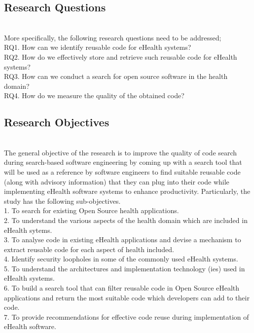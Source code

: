 \documentclass[a4paper]{article}
\begin{document}
\subsection{Research Questions}\\ More specifically, the following research questions need to be addressed;\\
RQ1. How can we identify reusable code for eHealth systems?\\
RQ2. How do we effectively store and retrieve such reusable code for eHealth systems?\\
RQ3. How can we conduct a search for open source software in the health domain?\\
RQ4. How do we measure the quality of the obtained code?\\ 

\subsection{Research Objectives}\\
The general objective of the research is to improve the quality of code search during search-based software engineering by coming up with a search tool that will be used as a reference by software engineers to find suitable reusable code (along with advisory information) that they can plug into their code while implementing eHealth software systems to enhance productivity.
Particularly, the study has the following sub-objectives.\\
1. To search for existing Open Source health applications.\\
2. To understand the various aspects of the health domain which are included in eHealth sytems.\\
3. To analyse code in existing eHealth applications and devise a mechanism to extract reusable code for each aspect of health included.\\
4. Identify security loopholes in some of the commonly used eHealth systems.\\
5. To understand the architectures and implementation technology (ies) used in eHealth systems.\\
6. To build a search tool that can filter reusable code in Open Source eHealth applications and return the most suitable code which developers can add to their code.\\
7. To provide recommendations for effective code reuse during implementation of eHealth software.
\\
\end{document}
